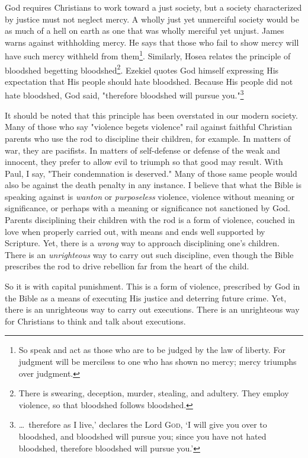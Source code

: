God requires Christians to work toward a just society, but a society characterized by justice must not neglect mercy.  A wholly just yet unmerciful society would be as much of a hell on earth as one that was wholly merciful yet unjust.  James warns against withholding mercy.  He says that those who fail to show mercy will have such mercy withheld from them\footnote{So speak and act as those who are to be judged by the law of liberty.  For judgment will be merciless to one who has shown no mercy; mercy triumphs over judgment.}.  Similarly, Hosea relates the principle of bloodshed begetting bloodshed\footnote{There is swearing, deception, murder, stealing, and adultery.  They employ violence, so that bloodshed follows bloodshed.}. Ezekiel quotes God himself expressing His expectation that His people should hate bloodshed. Because His people did not hate bloodshed, God said, "therefore bloodshed will pursue you."\footnote{\ldots\ therefore as I live,' declares the Lord \textsc{God}, `I will give you over to bloodshed, and bloodshed will pursue you; since you have not hated bloodshed, therefore bloodshed will pursue you.'}

It should be noted that this principle has been overstated in our modern society.  Many of those who say "violence begets violence" rail against faithful Christian parents who use the rod to discipline their children, for example.  In matters of war, they are pacifists.  In matters of self-defense or defense of the weak and innocent, they prefer to allow evil to triumph so that good may result.  With Paul, I say, "Their condemnation is deserved." Many of those same people would also be against the death penalty in any instance.  I believe that what the Bible is speaking against is \textit{wanton} or \textit{purposeless} violence, violence without meaning or significance, or perhaps with a meaning or significance not sanctioned by God.  Parents disciplining their children with the rod is a form of violence, couched in love when properly carried out, with means and ends well supported by Scripture.  Yet, there is a \textit{wrong} way to approach disciplining one's children.  There is an \textit{unrighteous} way to carry out such discipline, even though the Bible prescribes the rod to drive rebellion far from the heart of the child.

So it is with capital punishment.  This is a form of violence, prescribed by God in the Bible as a means of executing His justice and deterring future crime.  Yet, there is an unrighteous way to carry out executions.  There is an unrighteous way for Christians to think and talk about executions.  

